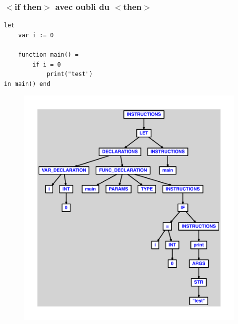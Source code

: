 \documentclass{article}
\begin{document}
\subsubsection{$ < $if then$ > $ avec oubli du $ < $then$ > $}
\begin{lstlisting}
let
	var i := 0

	function main() =
		if i = 0
			print("test")
in main() end
\end{lstlisting}
\newpage
\begin{figure}[H]
\centering
\includegraphics[max width=\textwidth]{ast/ast_252.pdf}
\end{figure}
\newpage
\end{document}
